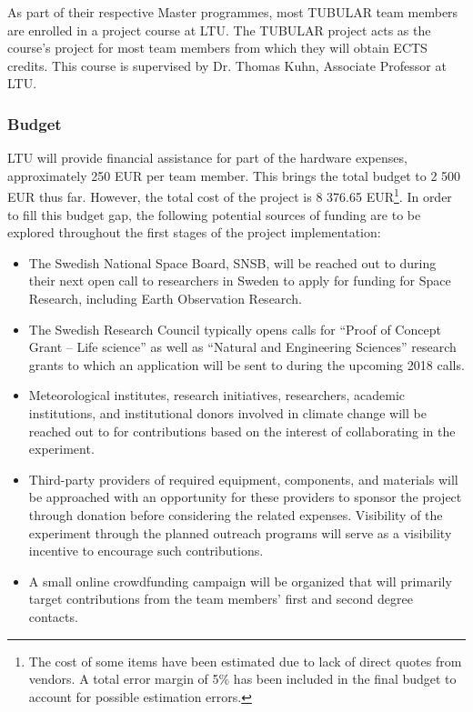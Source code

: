 As part of their respective Master programmes, most TUBULAR team members are enrolled in a project course at LTU. The TUBULAR project acts as the course's project for most team members from which they will obtain ECTS credits. This course is supervised by Dr. Thomas Kuhn, Associate Professor at LTU.

\pagebreak
\subsubsection{Budget}
LTU will provide financial assistance for part of the hardware expenses, approximately 250 EUR per team member. This brings the total budget to 2 500 EUR thus far. However, the total cost of the project is 8 376.65 EUR\footnote{The cost of some items have been estimated due to lack of direct quotes from vendors. A total error margin of 5\% has been included in the final budget to account for possible estimation errors.}. In order to fill this budget gap, the following potential sources of funding are to be explored throughout the first stages of the project implementation:

\begin{itemize}
    \item The Swedish National Space Board, SNSB, will be reached out to during their next open call to researchers in Sweden to apply for funding for Space Research, including Earth Observation Research.
    \item The Swedish Research Council typically opens calls for \enquote{Proof of Concept Grant – Life science} as well as \enquote{Natural and Engineering Sciences} research grants to which an application will be sent to during the upcoming 2018 calls.
    \item Meteorological institutes, research initiatives, researchers, academic institutions, and institutional donors involved in climate change will be reached out to for contributions based on the interest of collaborating in the experiment.
    \item Third-party providers of required equipment, components, and materials will be approached with an opportunity for these providers to sponsor the project through donation before considering the related expenses. Visibility of the experiment through the planned outreach programs will serve as a visibility incentive to encourage such contributions.
    \item A small online crowdfunding campaign will be organized that will primarily target contributions from the team members' first and second degree contacts.
\end{itemize}

